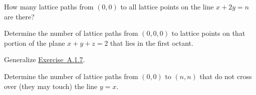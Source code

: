 \documentclass[10pt,]{book}
\theoremstyle{plain}
\theoremstyle{definition}
\theoremstyle{definition}
\theoremstyle{definition}
\theoremstyle{definition}
\numberwithin{equation}{chapter}
\begin{document}
\begin{divisionexercise}{6}\hypertarget{exercise-127}{}
\hypertarget{p-1275}{}%
How many lattice paths from \(\left( 0,0 \right)\) to all lattice points on the line \(x + 2y = n\) are there?%
\end{divisionexercise}%
\begin{divisionexercise}{7}\hypertarget{ex-paths-to-plane}{}
\hypertarget{p-1276}{}%
Determine the number of lattice paths from \(\left( 0,0,0 \right)\) to lattice points on that portion of the plane \(x + y + z = 2\) that lies in the first octant.%
\end{divisionexercise}%
\begin{divisionexercise}{8}\hypertarget{exercise-129}{}
\hypertarget{p-1277}{}%
Generalize \hyperlink{ex-paths-to-plane}{Exercise~A.1.7}.%
\end{divisionexercise}%
\begin{divisionexercise}{9}\hypertarget{exercise-130}{}
\hypertarget{p-1278}{}%
Determine the number of lattice paths from \(\left( 0,0 \right)\) to \((n,n)\) that do not cross over (they may touch) the line \(y = x\).%
\end{divisionexercise}%
\typeout{************************************************}
\typeout{************************************************}
\end{document}
